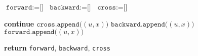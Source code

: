 \documentclass[a4paper, 12pt]{report}
\begin{document}
    \begin{nocaptionalg}
        \begin{algorithmic}[1]
                \State $\texttt{forward} := \texttt{[]}$
                \State $\texttt{backward} := \texttt{[]}$
                \State $\texttt{cross} := \texttt{[]}$

                            \State \textbf{continue} 
                            \State $\texttt{cross.append(}(u, x)\texttt{)}$
                            \State $\texttt{backward.append(}(u, x)\texttt{)}$
                        \Else
                            \State $\texttt{forward.append(}(u, x)\texttt{)}$
                        \EndIf
                    \EndFor
                \EndFor

                \State \textbf{return} \texttt{forward}, \texttt{backward}, \texttt{cross}
            \EndFunction
        \end{algorithmic}
    \end{nocaptionalg}
\end{document}
